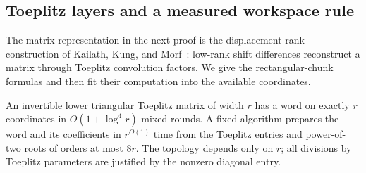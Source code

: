 \subsection{Toeplitz layers and a measured workspace rule}

The matrix representation in the next proof is the displacement-rank
construction of Kailath, Kung, and Morf~\cite[Lemmas~1--2]{kailathKungMorf1979}:
low-rank shift differences reconstruct a matrix through Toeplitz
convolution factors. We give the rectangular-chunk formulas and then
fit their computation into the available coordinates.

\begin{lemma}\label{loc:toeplitz}
An invertible lower triangular Toeplitz matrix of width $r$ has a word
on exactly $r$ coordinates in $O(1+\log^4r)$ mixed rounds.  A fixed
algorithm prepares the word and its coefficients in $r^{O(1)}$ time
from the Toeplitz entries and power-of-two roots of orders at most
$8r$.  The topology depends only on $r$; all divisions by Toeplitz
parameters are justified by the nonzero diagonal entry.
\end{lemma}

